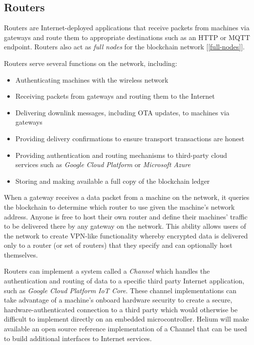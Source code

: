 \documentclass[10pt, nonatbib, nocopyrightspace, reprint]{sigplanconf}
\newcommand{\secref}[1]{[\autoref{#1}]}
\begin{document}
\subsection{Routers}

Routers are Internet-deployed applications that receive packets from machines via gateways and route them to appropriate destinations such as an HTTP or MQTT endpoint. Routers also act as \emph{full nodes} for the blockchain network \secref{full-nodes}.

Routers serve several functions on the network, including:

\begin{itemize}
    \item Authenticating machines with the wireless network
    \item Receiving packets from gateways and routing them to the Internet
    \item Delivering downlink messages, including OTA updates, to machines via gateways
    \item Providing delivery confirmations to ensure transport transactions are honest
    \item Providing authentication and routing mechanisms to third-party cloud services such as \emph{Google Cloud Platform} or \emph{Microsoft Azure}
    \item Storing and making available a full copy of the blockchain ledger
\end{itemize}

When a gateway receives a data packet from a machine on the network, it queries the blockchain to determine which router to use given the machine's network address. Anyone is free to host their own router and define their machines' traffic to be delivered there by any gateway on the network. This ability allows users of the network to create VPN-like functionality whereby encrypted data is delivered only to a router (or set of routers) that they specify and can optionally host themselves.

Routers can implement a system called a \emph{Channel} which handles the authentication and routing of data to a specific third party Internet application, such as \emph{Google Cloud Platform IoT Core}. These channel implementations can take advantage of a machine's onboard hardware security to create a secure, hardware-authenticated connection to a third party which would otherwise be difficult to implement directly on an embedded microcontroller. Helium will make available an open source reference implementation of a Channel that can be used to build additional interfaces to Internet services.
\end{document}
